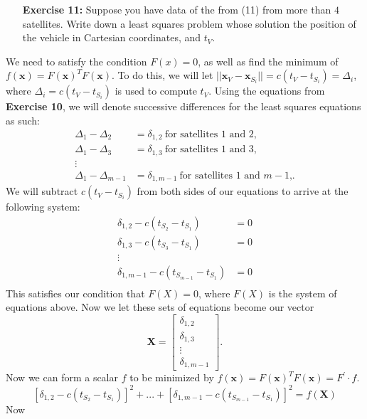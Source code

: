 \documentclass[11pt]{article}
\theoremstyle{definition}
\newcommand{\1}[1]{\mathbf{1} \left \{ #1 \right \}}
\begin{document}
\begin{itemize}
\item[{\textbf{Exercise 11:}}] Suppose you have data of the from (11) from more than $4$ satellites.  Write down a least squares problem whose solution the position of the vehicle in Cartesian coordinates, and $t_V$.
\end{itemize}
We need to satisfy the condition $F(x) = 0$, as well as find the minimum of \(f(\textbf{x}) = F(\textbf{x})^T F(\textbf{x})\).  To do this, we will let \(||\textbf{x}_V - \textbf{x}_{S_i}|| = c(t_V - t_{S_i}) = \Delta_i\), where \(\Delta_i = c(t_V - t_{S_i})\) is used to compute $t_V$.  Using the equations from \textbf{Exercise 10}, we will denote successive differences for the least squares equations as such:
\begin{align*}
    \Delta_1 - \Delta_2 &= \delta_{1,2} \ \text{for satellites 1 and 2,} \\
    \Delta_1 - \Delta_3 &= \delta_{1,3} \ \text{for satellites 1 and 3,} \\
    \vdots \\
    \Delta_1 - \Delta_{m-1} &= \delta_{1,m-1} \ \text{for satellites 1 and $m-1$,}.
\end{align*}
We will subtract $c(t_V - t_{S_i})$ from both sides of our equations to arrive at the following system:
\begin{align*}
    \delta_{1,2} - c(t_{S_2} - t_{S_1}) &= 0 \\
    \delta_{1,3} - c(t_{S_3} - t_{S_1}) &= 0 \\
    \vdots \\
    \delta_{1,m-1} - c(t_{S_{m-1}} - t_{S_1}) &= 0 \\
\end{align*}
This satisfies our condition that $F(X) = 0$, where $F(X)$ is the system of equations above.  Now we let these sets of equations become our vector
\[\textbf{X} = \begin{bmatrix}
\delta_{1,2} \\ \delta_{1,3} \\ \vdots \\ \delta_{1,m-1} \end{bmatrix}.\]
Now we can form a scalar $f$ to be minimized by \(f(\textbf{x}) = F(\textbf{x})^T F(\textbf{x}) = F^{\prime} \cdot f\).
\[[\delta_{1,2} - c(t_{S_2} - t_{S_1})]^2 + ... + [\delta_{1,m-1} - c(t_{S_{m-1}} - t_{S_1})]^2 = f(\textbf{X})\]
Now
\end{document}
